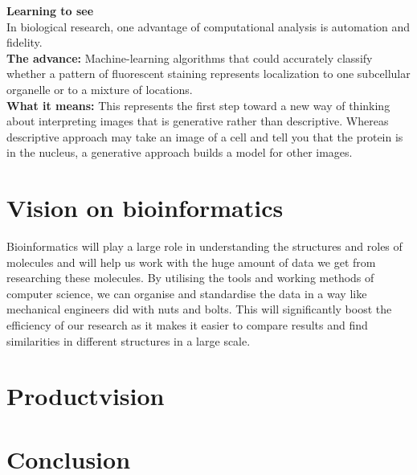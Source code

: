 \documentclass[10pt,a4paper]{article}
\begin{document}
\textbf{Learning to see}\\
In biological research, one advantage of computational analysis is automation and fidelity.\\
\textbf{The advance:} Machine-learning algorithms that could accurately classify whether a pattern of fluorescent staining represents localization to one subcellular organelle or to a mixture of locations.\\
\textbf{What it means:} This represents the first step toward a new way of thinking about interpreting images that is generative rather than descriptive.
Whereas descriptive approach may take an image of a cell and tell you that the protein is in the nucleus, a generative approach builds a model for other images.

\newpage
\section{Vision on bioinformatics}
Bioinformatics will play a large role in understanding the structures and roles of molecules and will help us work with the huge amount of data we get from researching these molecules. By utilising the tools and working methods of computer science, we can organise and standardise the data in a way like mechanical engineers did with nuts and bolts. This will significantly boost the efficiency of our research as it makes it easier to compare results and find similarities in different structures in a large scale.

\section{Productvision}

\section{Conclusion}
\end{document}

